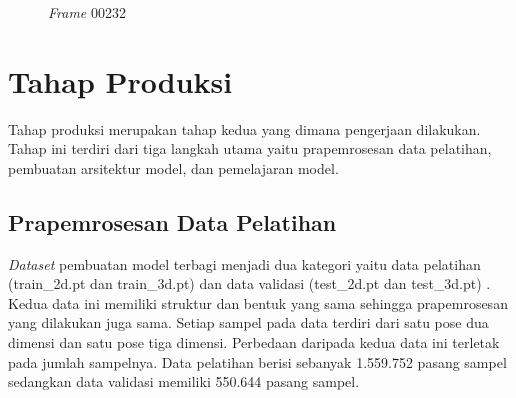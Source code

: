 \begin{figure}[htbp]
    \begin{center}
    \end{center}
    \vspace{-20pt}
    \captionsetup{labelfont=bf, textfont=bf}
    \caption{\textit{Frame} 00232}
    \vspace{-10pt}
    \captionsetup{labelfont=md, textfont=md}
    \label{fig:frame00232}
\end{figure}

\section{Tahap Produksi} \label{sec:3-TahapProduksi}

Tahap produksi merupakan tahap kedua yang dimana pengerjaan dilakukan. Tahap ini terdiri dari
tiga langkah utama yaitu prapemrosesan data pelatihan, pembuatan arsitektur model, dan pemelajaran model.


\subsection{Prapemrosesan Data Pelatihan}

\textit{Dataset} pembuatan model terbagi menjadi dua kategori yaitu data pelatihan
(train\_2d.pt dan train\_3d.pt) dan data validasi (test\_2d.pt dan test\_3d.pt) .
Kedua data ini memiliki struktur dan bentuk yang sama sehingga prapemrosesan yang dilakukan juga sama.
Setiap sampel pada data terdiri dari satu pose dua dimensi dan satu pose tiga dimensi.
Perbedaan daripada kedua data ini terletak pada jumlah sampelnya. Data pelatihan berisi sebanyak
1.559.752 pasang sampel sedangkan data validasi memiliki 550.644 pasang sampel.

